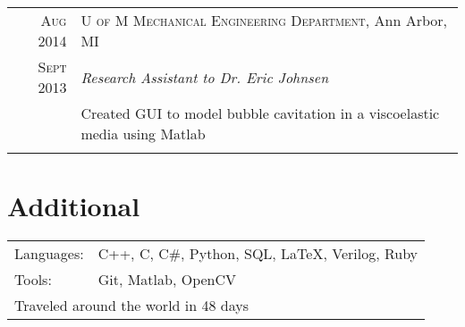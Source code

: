 \documentclass[a4paper,11pt]{article} %
\begin{document}

\begin{tabular}{r|p{13cm}}
\textsc{Aug 2014} & \textsc{U of M Mechanical Engineering Department}, Ann Arbor, MI \\
\textsc{Sept 2013} & \emph{Research Assistant to Dr. Eric Johnsen} \\
& \footnotesize{Created GUI to model bubble cavitation in a viscoelastic media using Matlab} \\
\multicolumn{2}{c}{} \\
\end{tabular}


\section{Additional}

\begin{tabular}{ll}
Languages: & C++, C, C\#, Python, SQL, \LaTeX, Verilog, Ruby \\
Tools: & Git, Matlab, OpenCV \\
\multicolumn{2}{l}{Traveled around the world in 48 days}\\
\end{tabular}

\clearpage %
\end{document}
